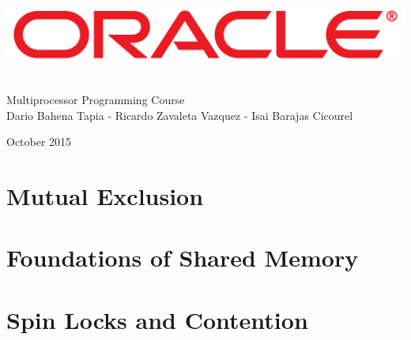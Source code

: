 \documentclass[letter,12pt]{report}
\begin{document}
\begin{titlepage}
\begin{center}

~\\[4 cm]

\includegraphics[width=15 cm]{Oracle_Logo.pdf}

~\\[0.5 cm]

{\LARGE Multiprocessor Programming Course} \\[0.2 cm]

{Dario Bahena Tapia - Ricardo Zavaleta Vazquez - Isai Barajas Cicourel}

{\small October 2015}

\end{center}
\end{titlepage}


\chapter{Mutual Exclusion}




\chapter{Foundations of Shared Memory}





\chapter{Spin Locks and Contention}




\end{document}
